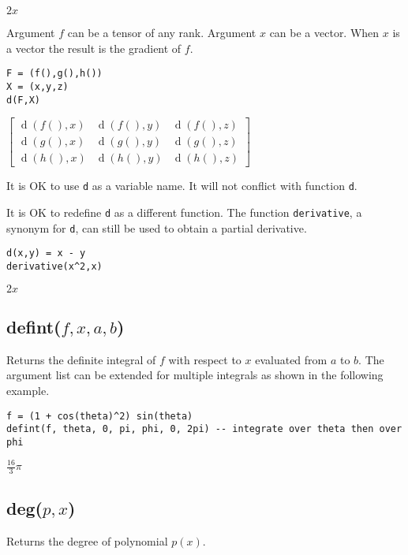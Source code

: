 \noindent
$2x$

\bigskip
\noindent
Argument $f$ can be a tensor of any rank.
Argument $x$ can be a vector.
When $x$ is a vector the result is the gradient of $f$.

{\color{blue}
\begin{verbatim}
F = (f(),g(),h())
X = (x,y,z)
d(F,X)
\end{verbatim}
}

\noindent
$\displaystyle \begin{bmatrix}
\operatorname{d}(f(),x) & \operatorname{d}(f(),y) &  \operatorname{d}(f(),z)\\
\operatorname{d}(g(),x) & \operatorname{d}(g(),y) &  \operatorname{d}(g(),z)\\
\operatorname{d}(h(),x) & \operatorname{d}(h(),y) &  \operatorname{d}(h(),z)
\end{bmatrix}
$

\bigskip
\noindent
It is OK to use {\tt d} as a variable name.
It will not conflict with function {\tt d}.

\bigskip
\noindent
It is OK to redefine {\tt d} as a different function.
The function {\tt derivative}, a synonym for {\tt d},
can still be used to obtain a partial derivative.

{\color{blue}
\begin{verbatim}
d(x,y) = x - y
derivative(x^2,x)
\end{verbatim}
}

\noindent
$2x$

\subsection*{defint($f,x,a,b$)}

Returns the definite integral of $f$ with respect to $x$
evaluated from $a$ to $b$.
The argument list can be extended for multiple integrals
as shown in the following example.

{\color{blue}
\begin{verbatim}
f = (1 + cos(theta)^2) sin(theta)
defint(f, theta, 0, pi, phi, 0, 2pi) -- integrate over theta then over phi
\end{verbatim}
}

\noindent
$\tfrac{16}{3}\pi$

\subsection*{deg($p,x$)}

Returns the degree of polynomial $p(x)$.

